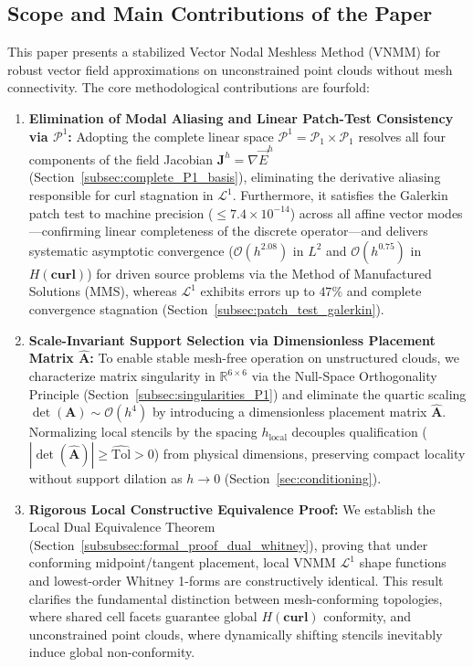 \documentclass[preprint,12pt]{elsarticle}
\begin{document}
\subsection{Scope and Main Contributions of the Paper}
\label{subsec:scope_contributions}

This paper presents a stabilized Vector Nodal Meshless Method (VNMM) for robust vector field approximations on unconstrained point clouds without mesh connectivity. The core methodological contributions are fourfold:

\begin{enumerate}
    \item \textbf{Elimination of Modal Aliasing and Linear Patch-Test Consistency via $\mathcal{P}^1$:}
          Adopting the complete linear space $\mathcal{P}^1 = \mathcal{P}_1 \times \mathcal{P}_1$ resolves all four components of the field Jacobian $\mathbf{J}^h = \nabla \vec{E}^h$ (Section~\ref{subsec:complete_P1_basis}), eliminating the derivative aliasing responsible for curl stagnation in $\mathcal{L}^1$. Furthermore, it satisfies the Galerkin patch test to machine precision ($\le 7.4 \times 10^{-14}$) across all affine vector modes---confirming linear completeness of the discrete operator---and delivers systematic asymptotic convergence ($\mathcal{O}(h^{2.08})$ in $L^2$ and $\mathcal{O}(h^{0.75})$ in $H(\mathbf{curl})$) for driven source problems via the Method of Manufactured Solutions (MMS), whereas $\mathcal{L}^1$ exhibits errors up to $47\%$ and complete convergence stagnation (Section~\ref{subsec:patch_test_galerkin}).

    \item \textbf{Scale-Invariant Support Selection via Dimensionless Placement Matrix $\widehat{\mathbf{A}}$:}
          To enable stable mesh-free operation on unstructured clouds, we characterize matrix singularity in $\mathbb{R}^{6\times6}$ via the Null-Space Orthogonality Principle (Section~\ref{subsec:singularities_P1}) and eliminate the quartic scaling $\det(\mathbf{A}) \sim \mathcal{O}(h^4)$ by introducing a dimensionless placement matrix $\widehat{\mathbf{A}}$. Normalizing local stencils by the spacing $h_{\mathrm{local}}$ decouples qualification ($|\det(\widehat{\mathbf{A}})| \ge \widehat{\mathrm{Tol}} > 0$) from physical dimensions, preserving compact locality without support dilation as $h \to 0$ (Section~\ref{sec:conditioning}).

    \item \textbf{Rigorous Local Constructive Equivalence Proof:}
          We establish the Local Dual Equivalence Theorem (Section~\ref{subsubsec:formal_proof_dual_whitney}), proving that under conforming midpoint/tangent placement, local VNMM $\mathcal{L}^1$ shape functions and lowest-order Whitney 1-forms are constructively identical. This result clarifies the fundamental distinction between mesh-conforming topologies, where shared cell facets guarantee global $H(\mathbf{curl})$ conformity, and unconstrained point clouds, where dynamically shifting stencils inevitably induce global non-conformity.


\end{enumerate}
\end{document}
